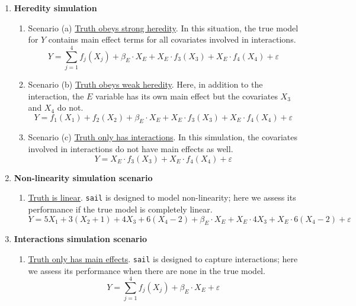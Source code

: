 \documentclass[useAMS,usenatbib,referee]{biom}
\begin{document}
\begin{enumerate}
	\item \textbf{Heredity simulation}
	\begin{enumerate}
		\item[] Scenario (a) \underline{Truth obeys strong heredity}. In this situation, the true model for $Y$ contains main effect terms for all covariates involved in interactions. \[Y = \sum_{j=1}^{4} f_j(X_{j}) + \beta_E \cdot X_{E} +  X_{E} \cdot f_3(X_{3}) + X_{E} \cdot f_4(X_{4}) + \varepsilon\]
		\item[] Scenario (b) \underline{Truth obeys weak heredity}. Here, in addition to the interaction, the $E$ variable has its own main effect but the covariates $X_3$ and $X_4$ do not.
		\[Y = f_1(X_{1}) + f_2(X_{2}) + \beta_E \cdot X_{E} +  X_{E} \cdot f_3(X_{3}) + X_{E} \cdot f_4(X_{4}) + \varepsilon\]
		\item[] Scenario (c) \underline{Truth only has interactions}. In this simulation, the covariates involved in interactions do not have main effects as well.  \[Y =  X_{E} \cdot f_3(X_{3}) + X_{E} \cdot f_4(X_{4}) + \varepsilon\]
	\end{enumerate}
	
	\item \textbf{Non-linearity simulation scenario}
	\begin{enumerate}
		\item[] \underline{Truth is linear}. \texttt{sail} is designed to model non-linearity; here we assess its performance if the true model is completely linear. \[Y = 5X_1 + 3(X_2 + 1) + 4X_3 + 6(X_4-2) + \beta_E \cdot X_{E} +  X_{E} \cdot 4X_3 + X_{E} \cdot 6(X_4-2) + \varepsilon\]
	\end{enumerate}
	
	\item \textbf{Interactions simulation scenario}
	\begin{enumerate}
		
		\item[] \underline{Truth only has main effects}. \texttt{sail} is designed to capture interactions; here we assess its performance when there are none in the true model. \[Y = \sum_{j=1}^{4} f_j(X_{j}) + \beta_E \cdot X_{E} + \varepsilon\]
	\end{enumerate}
	
	
\end{enumerate}
\end{document}
